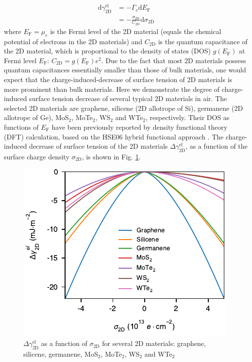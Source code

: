 \documentclass[aps,prl,reprint,groupedaddress,amsmath,amssymb, showpacs]{revtex4-1}
\begin{document}
\begin{equation}
\label{eqn:dgamma-QC}
\begin{aligned}
\mathrm{d} \gamma_{\mathrm{2D}}^{\mathrm{el}} &= -\Gamma_{e} \mathrm{d} E_{\mathrm{F}} \\
                                              &= -\frac{\sigma_{\mathrm{2D}}}{C_{\mathrm{2D}}} \mathrm{d}\sigma_{\mathrm{2D}}
\end{aligned}
\end{equation}
where \(E_{\mathrm{F}}=\mu_{e}\) is the Fermi level of the 2D material
(equals the chemical potential of electrons in the 2D materials) and
\(C_{\mathrm{2D}}\) is the quantum capacitance of the 2D material, which
is proportional to the density of states (DOS) \(g(E_{\mathrm{F}})\) at
Fermi level \(E_{\mathrm{F}}\):
\(C_{\mathrm{2D}}=g(E_{\mathrm{F}})e^{2}\). Due to the fact that most 2D
materials possess quantum capacitances essentially smaller than those
of bulk materials, one would expect that the charge-induced-decrease
of surface tension of 2D materials is more prominent than bulk
materials. Here we demonstrate the degree of charge-induced
surface tension decrease of several typical 2D materials in
air. The selected 2D materials are graphene, silicene (2D allotrope
of Si), germanene (2D allotrope of Ge), MoS\(_{\text{2}}\), MoTe\(_{\text{2}}\), WS\(_{\text{2}}\) and
WTe\(_{\text{2}}\), respectively. Their DOS as functions of \(E_{\mathrm{F}}\) have been previously
reported by density functional theory (DFT) calculation, based on the
HSE06 hybrid functional approach \cite{tian_multiscale_2016}. The
charge-induced decrease of surface tension of the 2D materials
\(\Delta \gamma_{\mathrm{2D}}^{\mathrm{el}}\), as a function of the
surface charge density \(\sigma_{\mathrm{2D}}\), is shown in Fig. \ref{fig:dgamma-sigma}.
\begin{figure}[htbp]
\centering
\includegraphics[width=0.95\linewidth]{../img/dgamma-sigma.pdf}
\caption{\label{fig:dgamma-sigma}
\(\Delta \gamma_{\mathrm{2D}}^{\mathrm{el}}\) as a function of \(\sigma_{\mathrm{2D}}\) for several 2D materials: graphene, silicene, germanene, MoS\(_{2}\), MoTe\(_{2}\), WS\(_{2}\) and WTe\(_{2}\)}
\end{figure}
\end{document}
